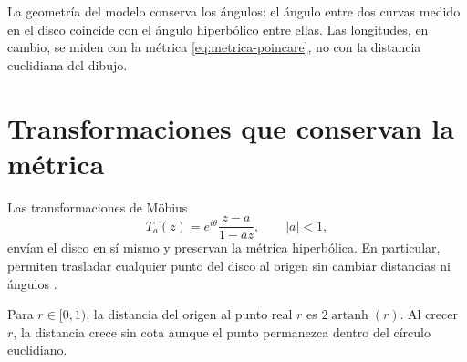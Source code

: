 La geometría del modelo conserva los ángulos: el ángulo entre dos curvas medido en el disco coincide con el ángulo hiperbólico entre ellas. Las longitudes, en cambio, se miden con la métrica \cref{eq:metrica-poincare}, no con la distancia euclidiana del dibujo.

\section{Transformaciones que conservan la métrica}

Las transformaciones de Möbius
\[
  T_a(z)=e^{i\theta}\frac{z-a}{1-\overline{a}z},
  \qquad |a|<1,
\]
envían el disco en sí mismo y preservan la métrica hiperbólica. En particular, permiten trasladar cualquier punto del disco al origen sin cambiar distancias ni ángulos \cite{anderson2005,stillwell2005}.

\begin{example}
Para \(r\in[0,1)\), la distancia del origen al punto real \(r\) es \(2\operatorname{artanh}(r)\). Al crecer \(r\), la distancia crece sin cota aunque el punto permanezca dentro del círculo euclidiano.
\end{example}
